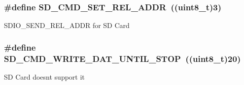 \subsubsection[{\texorpdfstring{S\+D\+\_\+\+C\+M\+D\+\_\+\+S\+E\+T\+\_\+\+R\+E\+L\+\_\+\+A\+D\+DR}{SD_CMD_SET_REL_ADDR}}]{\setlength{\rightskip}{0pt plus 5cm}\#define S\+D\+\_\+\+C\+M\+D\+\_\+\+S\+E\+T\+\_\+\+R\+E\+L\+\_\+\+A\+D\+DR~((uint8\+\_\+t)3)}\hypertarget{group___s_t_m324x_g___e_v_a_l___s_d_i_o___s_d___exported___constants_gaa7e0f4e84001656eac62b41179376a25}{}\label{group___s_t_m324x_g___e_v_a_l___s_d_i_o___s_d___exported___constants_gaa7e0f4e84001656eac62b41179376a25}
S\+D\+I\+O\+\_\+\+S\+E\+N\+D\+\_\+\+R\+E\+L\+\_\+\+A\+D\+DR for SD Card 
\subsubsection[{\texorpdfstring{S\+D\+\_\+\+C\+M\+D\+\_\+\+W\+R\+I\+T\+E\+\_\+\+D\+A\+T\+\_\+\+U\+N\+T\+I\+L\+\_\+\+S\+T\+OP}{SD_CMD_WRITE_DAT_UNTIL_STOP}}]{\setlength{\rightskip}{0pt plus 5cm}\#define S\+D\+\_\+\+C\+M\+D\+\_\+\+W\+R\+I\+T\+E\+\_\+\+D\+A\+T\+\_\+\+U\+N\+T\+I\+L\+\_\+\+S\+T\+OP~((uint8\+\_\+t)20)}\hypertarget{group___s_t_m324x_g___e_v_a_l___s_d_i_o___s_d___exported___constants_ga6478634540db1fa3fcd044315d1238b5}{}\label{group___s_t_m324x_g___e_v_a_l___s_d_i_o___s_d___exported___constants_ga6478634540db1fa3fcd044315d1238b5}
SD Card doesn\textquotesingle{}t support it 